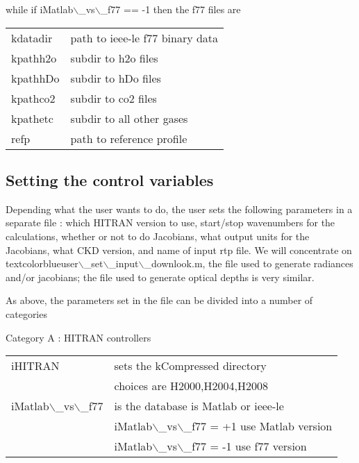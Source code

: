 \documentclass[11pt]{article}
\begin{document}
\begin{enumerate}
while if iMatlab$\backslash$\_vs$\backslash$\_f77 == -1 then the f77 files are

\begin{center}
\begin{tabular}{ll}
kdatadir & path to ieee-le f77 binary data\\
kpathh2o & subdir to h2o files\\
kpathhDo & subdir to hDo files\\
kpathco2 & subdir to co2 files\\
kpathetc & subdir to all other gases\\
refp & path to reference profile\\
\end{tabular}
\end{center}
\end{enumerate}

\subsection{Setting the control variables}
\label{sec-3-2}

Depending what the user wants to do, the user sets the following
parameters in a separate file : which HITRAN version to use, start/stop
wavenumbers for the calculations, whether or not to do Jacobians, what
output units for the Jacobians, what CKD version, and name of input rtp
file. We will concentrate on textcolorblueuser$\backslash$\_set$\backslash$\_input$\backslash$\_downlook.m,
the file used to generate radiances and/or jacobians; the file used to
generate optical depths is very similar.

As above, the parameters set in the file can be divided into a number of
categories

Category A : HITRAN controllers

\begin{center}
\begin{tabular}{ll}
iHITRAN & sets the kCompressed directory\\
 & choices are H2000,H2004,H2008\\
iMatlab$\backslash$\_vs$\backslash$\_f77 & is the database is Matlab or ieee-le\\
 & iMatlab$\backslash$\_vs$\backslash$\_f77 = +1 use Matlab version\\
 & iMatlab$\backslash$\_vs$\backslash$\_f77 = -1 use f77 version\\
\end{tabular}
\end{center}
\end{document}
